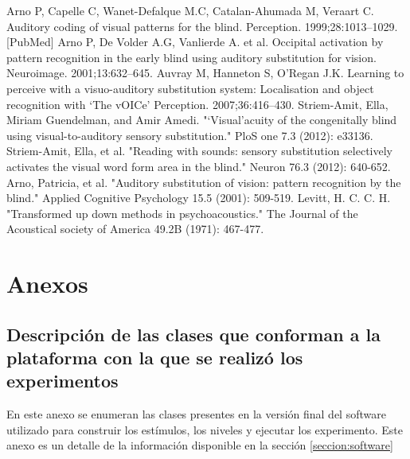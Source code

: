 \documentclass{article}
\numberwithin{figure}{section}
\begin{document}
\begin{thebibliography}{9}
Arno P, Capelle C, Wanet-Defalque M.C, Catalan-Ahumada M, Veraart C. Auditory coding of visual patterns for the blind. Perception. 1999;28:1013–1029. [PubMed]
Arno P, De Volder A.G, Vanlierde A. et al. Occipital activation by pattern recognition in the early blind using auditory substitution for vision. Neuroimage. 2001;13:632–645.
Auvray M, Hanneton S, O’Regan J.K. Learning to perceive with a visuo-auditory substitution system: Localisation and object recognition with ‘The vOICe’ Perception. 2007;36:416–430.
Striem-Amit, Ella, Miriam Guendelman, and Amir Amedi. "‘Visual’acuity of the congenitally blind using visual-to-auditory sensory substitution." PloS one 7.3 (2012): e33136.
Striem-Amit, Ella, et al. "Reading with sounds: sensory substitution selectively activates the visual word form area in the blind." Neuron 76.3 (2012): 640-652.
Arno, Patricia, et al. "Auditory substitution of vision: pattern recognition by the blind." Applied Cognitive Psychology 15.5 (2001): 509-519.
Levitt, H. C. C. H. "Transformed up down methods in psychoacoustics." The Journal of the Acoustical society of America 49.2B (1971): 467-477.
\end{thebibliography}


\clearpage

\section{Anexos}
\subsection{Descripción de las clases que conforman a la plataforma con la que se realizó los experimentos} \label{anexo:Clases}

    En este anexo se enumeran las clases presentes en la versión final del software utilizado para construir los estímulos, los niveles y ejecutar los experimento. Este anexo es un detalle de la información disponible en la sección \ref{seccion:software}
    
\end{document}

